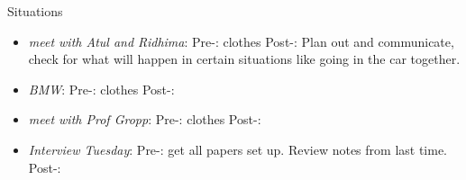 \documentclass[serif, mathserif, final]{beamer}
\begin{document}
\begin{frame}{}
\begin{columns}
\begin{column}{0.20\linewidth}
  \begin{block}{Situations} 
    \begin{itemize} 
      \tiny \item \tiny \textit{meet with Atul and Ridhima}: Pre-: clothes
      Post-: Plan out and communicate, check for what will happen in
      certain situations like going in the car together.  
      \item \tiny \textit{BMW}: Pre-: clothes   Post-:  
    \item \tiny \textit{meet with Prof Gropp}: Pre-: clothes   Post-:  
      \item \tiny \textit{Interview Tuesday}: Pre-: get all papers set
        up.  Review notes from last time. Post-:  
    \end{itemize}
  \end{block}
\end{column}%
\end{columns}

\end{frame}
\end{document}
